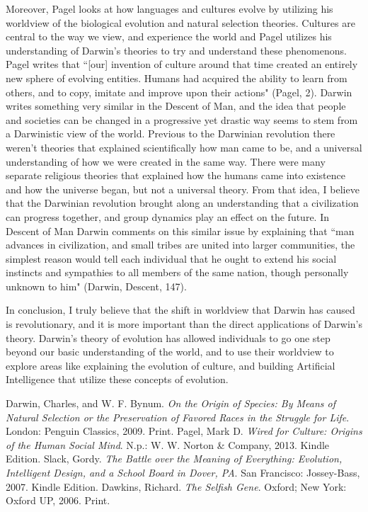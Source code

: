 \documentclass[11pt, oneside]{article}
\begin{document}
\par Moreover, Pagel looks at how languages and cultures evolve by utilizing his worldview of the biological evolution and natural selection theories. Cultures are central to the way we view, and experience the world and Pagel utilizes his understanding of Darwin's theories to try and understand these phenomenons. Pagel writes that ``[our] invention of culture around that time created an entirely new sphere of evolving entities. Humans had acquired the ability to learn from others, and to copy, imitate and improve upon their actions" (Pagel, 2). Darwin writes something very similar in the Descent of Man, and the idea that people and societies can be changed in a progressive yet drastic way seems to stem from a Darwinistic view of the world. Previous to the Darwinian revolution there weren't theories that explained scientifically how man came to be, and a universal understanding of how we were created in the same way. There were many separate religious theories that explained how the humans came into existence and how the universe began, but not a universal theory. From that idea, I believe that the Darwinian revolution brought along an understanding that  a civilization can progress together, and group dynamics play an effect on the future. In Descent of Man Darwin comments on this similar issue by explaining that ``man advances in civilization, and small tribes are united into larger communities, the simplest reason would tell each individual that he ought to extend his social instincts and sympathies to all members of the same nation, though personally unknown to him" (Darwin, Descent, 147). 


\par In conclusion, I truly believe that the shift in worldview that Darwin has caused is revolutionary, and it is more important than the direct applications of Darwin's theory. Darwin's theory of evolution has allowed individuals to go one step beyond our basic understanding of the world, and to use their worldview to explore areas like explaining the evolution of culture, and building Artificial Intelligence that utilize these concepts of evolution. 


\begin{thebibliography}{9}
	Darwin, Charles, and W. F. Bynum.
	\emph{On the Origin of Species: By Means of Natural Selection or the Preservation of Favored Races in the Struggle for Life}.
	London: Penguin Classics, 2009.
	Print.
	Pagel, Mark D. 
	\emph{Wired for Culture: Origins of the Human Social Mind}. 
	N.p.: W. W. Norton \& Company, 2013. 
	Kindle Edition. 
	Slack, Gordy. 
	\emph{The Battle over the Meaning of Everything: Evolution, Intelligent Design, and a School Board in Dover, PA}.
	San Francisco: Jossey-Bass, 2007. 
	Kindle Edition.
	Dawkins, Richard. 
	\emph{The Selfish Gene}.
	Oxford; New York: Oxford UP, 2006. 
	Print.
\end{thebibliography}
\end{document}
